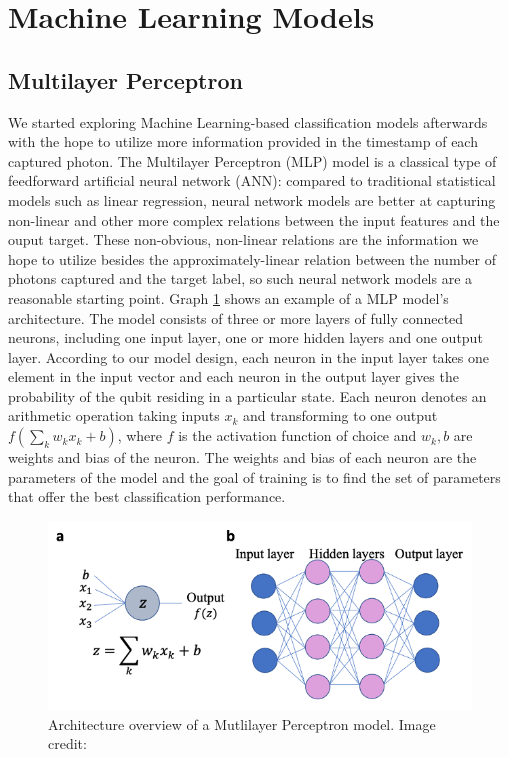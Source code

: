 \documentclass[letterpaper,twocolumn,10pt]{article}
\begin{document}
\section{Machine Learning Models}

\subsection{Multilayer Perceptron}

We started exploring Machine Learning-based classification models afterwards with the hope to utilize more information provided in the timestamp of each captured photon. The Multilayer Perceptron (MLP) model is a classical type of feedforward artificial neural network (ANN): compared to traditional statistical models such as linear regression, neural network models are better at capturing non-linear and other more complex relations between the input features and the ouput target. These non-obvious, non-linear relations are the information we hope to utilize besides the approximately-linear relation between the number of photons captured and the target label, so such neural network models are a reasonable starting point. Graph \ref{fig:mlp_architecture} shows an example of a MLP model's architecture. The model consists of three or more layers of fully connected neurons, including one input layer, one or more hidden layers and one output layer. According to our model design, each neuron in the input layer takes one element in the input vector and each neuron in the output layer gives the probability of the qubit residing in a particular state. Each neuron denotes an arithmetic operation taking inputs $x_k$ and transforming to one output $f(\sum_{k}{w_k}{x_k} + b)$, where $f$ is the activation function of choice and $w_k, b$ are weights and bias of the neuron. The weights and bias of each neuron are the parameters of the model and the goal of training is to find the set of parameters that offer the best classification performance.

\begin{figure}
    \includegraphics[width=\linewidth]{Figures/mlp_architecture.png}
    \centering
    \caption{Architecture overview of a Mutlilayer Perceptron model. Image credit: \cite{ml-qubit}}
    \label{fig:mlp_architecture}
\end{figure}
\end{document}
